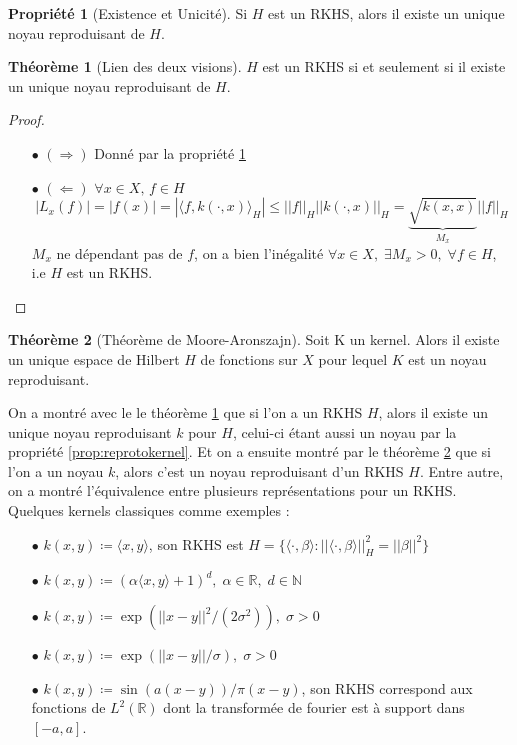 \documentclass[a4paper, 11pt, french]{article}
\theoremstyle{definition}
\newtheorem{theorem}{Théorème}
\newtheorem{property}{Propriété}
\begin{document}
	\begin{property}[Existence et Unicité]
	\label{th:existunicity}
		Si $H$ est un RKHS, alors il existe un unique noyau reproduisant de $H$.
	\end{property}

	\begin{theorem}[Lien des deux visions]
		\label{th:link2visions}
		$H$ est un RKHS si et seulement si il existe un unique noyau reproduisant de $H$.
	\end{theorem}
	\begin{proof}
		\begin{itemize}
			\item[$\bullet$] $(\Rightarrow)$
				Donné par la propriété \ref{th:existunicity} 
			\item[$\bullet$] $(\Leftarrow)$ $\forall x \in X, \, f \in H$
				\[|L_x(f)| = |f(x)| = |\langle f, k(\cdot, x) \rangle_H| \leq ||f||_H ||k(\cdot,x)||_H = \underbrace{\sqrt{k(x,x)}}_{\text{$M_x$}} ||f||_H\]
				$M_x$ ne dépendant pas de $f$, on a bien l'inégalité $\forall x \in X, \;  \exists M_x > 0, \; \forall f \in H$, i.e $H$ est un RKHS.
		\end{itemize}
	\end{proof}
	
	\begin{theorem}[Théorème de Moore-Aronszajn]
	\label{th:mooaron}
	 	Soit K un kernel. Alors il existe un unique espace de Hilbert $H$ de fonctions sur $X$ pour lequel $K$ est un noyau reproduisant.
	\end{theorem}

	On a montré avec le le théorème \ref{th:link2visions} que si l'on a un RKHS $H$, alors il existe un unique noyau reproduisant $k$ pour $H$, celui-ci étant aussi un noyau par la propriété  \ref{prop:reprotokernel}. Et on a ensuite montré par le théorème \ref{th:mooaron} que si l'on a un noyau $k$, alors c'est un noyau reproduisant d'un RKHS $H$. Entre autre, on a montré l'équivalence entre plusieurs représentations pour un RKHS. \\
	
	Quelques kernels classiques comme exemples :
	\begin{itemize}
		\item[$\bullet$] $k(x, y) \coloneqq \langle x, y \rangle$, son RKHS est $H = \{\langle \cdot, \beta \rangle : ||\langle \cdot, \beta \rangle||_H^2 = ||\beta||^2\}$
		\item[$\bullet$] $k(x, y) \coloneqq (\alpha \langle x, y \rangle + 1)^d, \; \alpha \in \mathbb{R}, \; d \in \mathbb{N}$
		\item[$\bullet$] $k(x, y) \coloneqq \exp(||x-y||^2 / (2\sigma^2)), \; \sigma > 0$
		\item[$\bullet$] $k(x, y) \coloneqq \exp(||x-y|| / \sigma), \; \sigma > 0$
		\item[$\bullet$] $k(x, y) \coloneqq \sin (a(x-y)) / \pi (x-y)$, son RKHS correspond aux fonctions de $L^2(\mathbb{R})$ dont la transformée de fourier est à support dans $[-a, a]$.
	\end{itemize}
	
\end{document}

